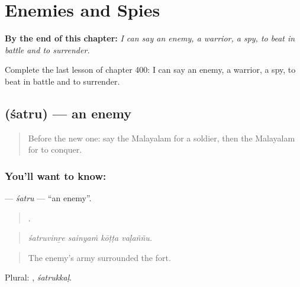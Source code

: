 
\chapter{Enemies and Spies}
\label{ch:ml-enemies-and-spies}

\begin{chapteropening}
\textbf{By the end of this chapter:} \emph{I can say an enemy, a warrior, a spy, to beat in battle and to surrender.}

Complete the last lesson of chapter 400: I can say an enemy, a warrior, a spy, to beat in battle and to surrender.
\end{chapteropening}

\section[\texorpdfstring{\ml{ശത്രു} (śatru)}{ശത്രു (śatru)}]{ (śatru) — an enemy}

\label{lesson:ML-C400-satru}



\begin{quote}
Before the new one: say the Malayalam for a soldier, then the Malayalam for to conquer.
\end{quote}

\subsection*{You'll want to know: }
\textbf{} — \emph{śatru} — \textquotedblleft{}an enemy\textquotedblright{}.

\begin{quote}
   .
\end{quote}

\begin{quote}
\emph{śatruvinṟe sainyaṁ kōṭṭa vaḷaññu.}
\end{quote}

\begin{quote}
The enemy's army surrounded the fort.
\end{quote}

Plural: , \emph{śatrukkaḷ}.

